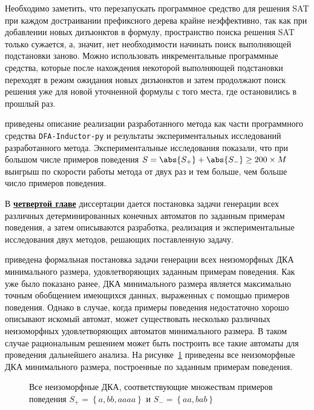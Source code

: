 Необходимо заметить, что перезапускать программное средство для решения SAT при каждом достраивании префиксного дерева крайне неэффективно, так как при добавлении новых дизъюнктов в формулу, пространство поиска решения SAT только сужается, а, значит, нет необходимости начинать поиск выполняющей подстановки заново.
Можно использовать инкрементальные программные средства, которые после нахождения некоторой выполняющей подстановки переходят в режим ожидания новых дизъюнктов и затем продолжают поиск решения уже для новой уточненной формулы с того места, где остановились в прошлый раз.

\insection{\ref{sec:cegar:results}} приведены описание реализации разработанного метода как части программного средства \texttt{DFA-Inductor-py} и результаты экспериментальных исследований разработанного метода. Экспериментальные исследования показали, что при большом числе примеров поведения $S=\abs{S_{+}}+\abs{S_{-}} \geq 200 \times M$ выигрыш по скорости работы метода от двух раз и тем больше, чем больше число примеров поведения.


В \textbf{\underline{четвертой главе}} диссертации дается постановка задачи генерации всех различных детерминированных конечных автоматов по заданным примерам поведения, а затем описываются разработка, реализация и экспериментальные исследования двух методов, решающих поставленную задачу. 

\insection{\ref{sec:findall:problem}} приведена формальная постановка задачи генерации всех неизоморфных ДКА минимального размера, удовлетворяющих заданным примерам поведения.
Как уже было показано ранее, ДКА минимального размера является максимально точным обобщением имеющихся данных, выраженных с помощью примеров поведения.
Однако в случае, когда примеры поведения недостаточно хорошо описывают искомый автомат, может существовать несколько различных неизоморфных удовлетворяющих автоматов минимального размера.
В таком случае рациональным решением может быть построить все такие автоматы для проведения дальнейшего анализа.
На рисунке~\ref{syn:img:find-all} приведены все неизоморфные ДКА минимального размера, построенные по заданным примерам поведения.
%
\begin{figure}[ht]
  \centering
  \scalebox{0.8}{}
  \caption{Все неизоморфные ДКА, соответствующие множествам примеров поведения $S_{+} = \left\{a, bb, aaaa\right\}$ и $S_{-}=\left\{aa, bab\right\}$}
  \label{syn:img:find-all}
\end{figure}

